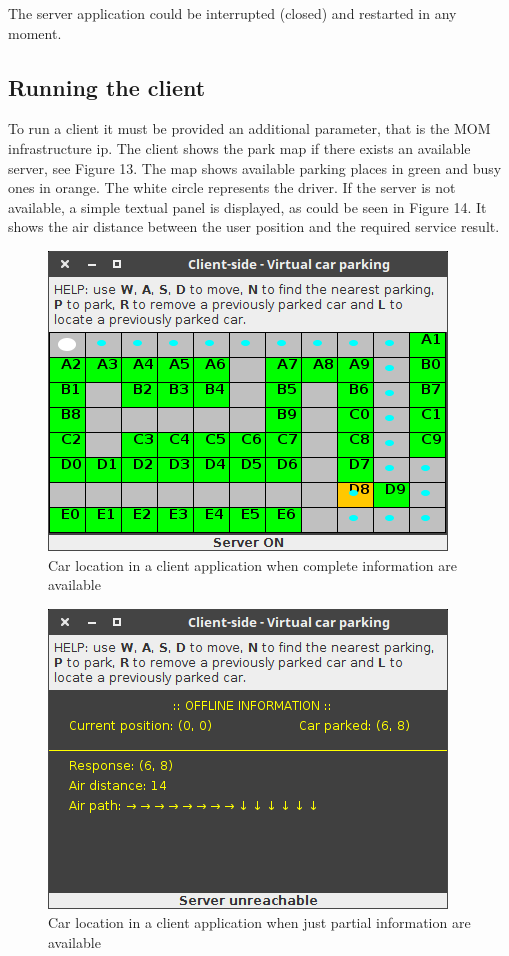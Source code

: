 \documentclass[11pt]{article}
\begin{document}
The server application could be interrupted (closed) and restarted in any moment.
\subsection{Running the client}
To run a client it must be provided an additional parameter, that is the MOM infrastructure ip. The client shows the park map if there exists an available server, see Figure 13. The map shows available parking places in green and busy ones in orange. The white circle represents the driver. If the server is not available, a simple textual panel is displayed, as could be seen in Figure 14. It shows the air distance between the user position and the required service result.
\begin{figure}
  \centering
	\includegraphics[scale=0.6]{clientServerOn}
  \caption{Car location in a client application when complete information are available}
\end{figure}

\begin{figure}
  \centering
	\includegraphics[scale=0.6]{clientServerOff}
  \caption{Car location in a client application when just partial information are available}
\end{figure}
\end{document}
